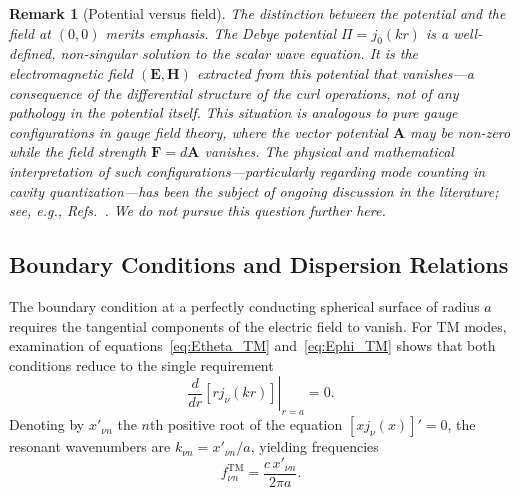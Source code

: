 \documentclass[
  aip,
  amsmath,amssymb,
  preprint
]{revtex4-1}
\newtheorem{remark}{Remark}[section]
\begin{document}
\begin{remark}[Potential versus field]
The distinction between the potential and the field at $(0,0)$ merits emphasis. The Debye potential $\Pi = j_0(kr)$ is a well-defined, non-singular solution to the scalar wave equation. It is the electromagnetic field $(\mathbf{E}, \mathbf{H})$ extracted from this potential that vanishes---a consequence of the differential structure of the curl operations, not of any pathology in the potential itself. This situation is analogous to pure gauge configurations in gauge field theory, where the vector potential $\mathbf{A}$ may be non-zero while the field strength $\mathbf{F} = d\mathbf{A}$ vanishes. The physical and mathematical interpretation of such configurations---particularly regarding mode counting in cavity quantization---has been the subject of ongoing discussion in the literature; see, e.g., Refs.~\cite{AharonovBohm1959, Berry1984}. We do not pursue this question further here.
\end{remark}


\subsection{Boundary Conditions and Dispersion Relations}


The boundary condition at a perfectly conducting spherical surface of radius $a$ requires the tangential components of the electric field to vanish. For TM modes, examination of equations~\eqref{eq:Etheta_TM} and~\eqref{eq:Ephi_TM} shows that both conditions reduce to the single requirement
\begin{equation}
\left.\frac{d}{dr}[r j_\nu(kr)]\right|_{r=a} = 0.
\label{eq:BC_TM}
\end{equation}
Denoting by $x'_{\nu n}$ the $n$th positive root of the equation $[xj_\nu(x)]' = 0$, the resonant wavenumbers are $k_{\nu n} = x'_{\nu n}/a$, yielding frequencies
\begin{equation}
f_{\nu n}^{\text{TM}} = \frac{c \, x'_{\nu n}}{2\pi a}.
\label{eq:freq_TM}
\end{equation}
\end{document}
